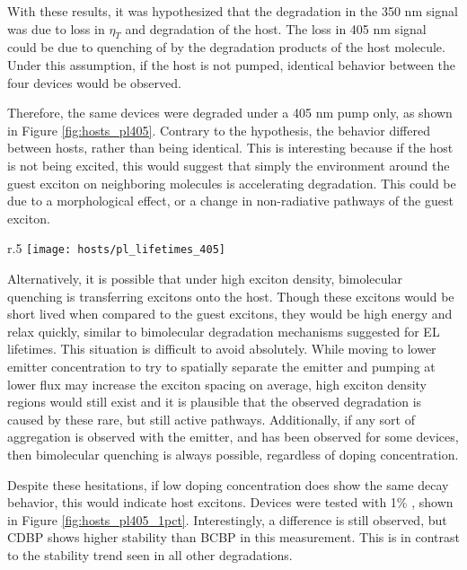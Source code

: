 \documentclass[../thesis.tex]{subfiles}
\begin{document}
With these results, it was hypothesized that the degradation in the 350 nm signal was due to loss in $\eta_T$ and degradation of the host.
The loss in 405 nm signal could be due to quenching of \irppy by the degradation products of the host molecule.
Under this assumption, if the host is not pumped, identical behavior between the four devices would be observed.


Therefore, the same devices were degraded under a 405 nm pump only, as shown in Figure \ref{fig:hosts_pl405}.
Contrary to the hypothesis, the behavior differed between hosts, rather than being identical.
This is interesting because if the host is not being excited, this would suggest that simply the environment around the guest exciton on neighboring molecules is accelerating degradation.
This could be due to a morphological effect, or a change in non-radiative pathways of the guest exciton.  

\begin{wrapfigure}{r}{.5\textwidth}
\centering
\texttt{[image: hosts/pl\_lifetimes\_405]}
\caption{Photodegradation at 405 nm. }
\label{fig:hosts_pl405}
\end{wrapfigure}

Alternatively, it is possible that under high exciton density, bimolecular quenching is transferring excitons onto the host.
Though these excitons would be short lived when compared to the guest excitons, they would be high energy and relax quickly, similar to bimolecular degradation mechanisms suggested for EL lifetimes.\supercite{Giebink2008a,Bangsund2018}
This situation is difficult to avoid absolutely.
While moving to lower emitter concentration to try to spatially separate the emitter and pumping at lower flux may increase the exciton spacing on average, high exciton density regions would still exist and it is plausible that the observed degradation is caused by these rare, but still active pathways.
Additionally, if any sort of aggregation is observed with the emitter, and has been observed for some devices, then bimolecular quenching is always possible, regardless of doping concentration.\supercite{Reineke2009}

Despite these hesitations, if low doping concentration does show the same decay behavior, this would indicate host excitons.
Devices were tested with 1\% \irppy, shown in Figure \ref{fig:hosts_pl405_1pct}.
Interestingly, a difference is still observed, but CDBP shows higher stability than BCBP in this measurement.
This is in contrast to the stability trend seen in all other degradations.
\end{document}
